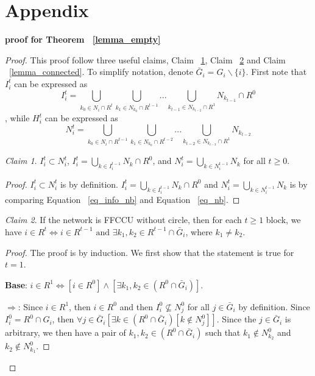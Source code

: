 \documentclass[12pt,letter]{article}
\theoremstyle{definition}
\theoremstyle{remark}
\theoremstyle{claim}
\newtheorem{claim}{Claim}
\begin{document}


\appendix
\section{Appendix}

\textbf{proof for Theorem ~\ref{lemma_empty}}
\begin{proof}
This proof follow three useful claims, Claim ~\ref{lemma_I_subset_N}, Claim ~\ref{lemma1} and Claim ~\ref{lemma_connected}. To simplify notation, denote $\bar{G}_i=G_i\backslash \{i\}$. First note that $I^t_i$ can be expressed as 
\begin{equation}
\label{eq_info_nb}
I^{t}_i = \bigcup_{k_0\in N_i\cap R^{t}}\bigcup_{k_1\in N_{k_0}\cap R^{t-1}}...\bigcup_{k_{t-1}\in N_{k_{t-2}}\cap R^{1}}N_{k_{t-1}}\cap R^0
\end{equation}
, while $H^t_i$ can be expressed as
\begin{equation}
\label{eq_nb}
N^t_i = \bigcup_{k_0\in N_i\cap R^{t-1}}\bigcup_{k_1\in N_{k_0}\cap R^{t-2}}...\bigcup_{k_{t-2}\in N_{k_{t-3}}\cap R^{1}}N_{k_{t-2}}
\end{equation}

\begin{claim}
\label{lemma_I_subset_N}
$I^t_i\subset N^t_i$, $I^t_i=\bigcup_{k\in I^{t-1}_i}N_k\cap R^0$, and $N^t_i=\bigcup_{k\in N^{t-1}_i}N_k$ for all $t\geq 0$.
\end{claim}
\begin{proof}
$I^t_i\subset N^t_i$ is by definition. $I^t_i=\bigcup_{k\in I^{t-1}_i}N_k\cap R^0$ and $N^t_i=\bigcup_{k\in N^{t-1}_i}N_k$ is by comparing Equation ~\ref{eq_info_nb} and Equation ~\ref{eq_nb}.
\end{proof}

\begin{claim}
\label{lemma1}
If the network is FFCCU without circle, then for each $t\geq 1$ block, we have $i\in R^t\Leftrightarrow i\in R^{t-1} \text{ and } \exists k_1,k_2\in R^{t-1}\cap \bar{G}_i$, where $k_1\neq k_2$.
\end{claim}
\begin{proof}
The proof is by induction. We first show that the statement is true for $t=1$. 

\textbf{Base}: $i\in R^1\Leftrightarrow [i\in R^0] \wedge [\exists k_1,k_2\in (R^0\cap \bar{G}_i)]$. 

$\Rightarrow$: Since $i\in R^1$, then $i\in R^0$ and then $I^0_i\nsubseteq N^0_j$ for all $j\in \bar{G}_i$ by definition. Since $I^0_i=R^0\cap G_i$, then $\forall j\in \bar{G}_i [\exists k\in (R^0\cap \bar{G}_i) [k\notin N^0_j]]$. Since the $j\in \bar{G}_i$ is arbitrary,  we then have a pair of $k_1, k_2 \in (R^0\cap \bar{G}_i)$ such that $k_1\notin N^0_{k_2}$ and $k_2\notin N^0_{k_1}$.


\end{proof}
\end{proof}
\end{document}
